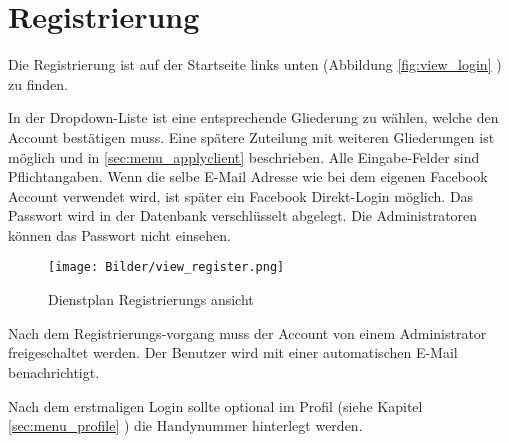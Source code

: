 \chapter{Registrierung}
\label{cha:register}

Die Registrierung ist auf der Startseite links unten (Abbildung  \ref{fig:view_login} \textit{}) zu finden.

\vspace*{5mm} \noindent In der Dropdown-Liste ist eine entsprechende Gliederung zu wählen, welche den Account bestätigen muss. Eine spätere Zuteilung mit weiteren Gliederungen ist möglich und in \ref{sec:menu_applyclient} \textit{} beschrieben. Alle Eingabe-Felder sind Pflichtangaben. Wenn die selbe E-Mail Adresse wie bei dem eigenen Facebook Account verwendet wird, ist später ein Facebook Direkt-Login möglich. Das Passwort wird in der Datenbank verschlüsselt abgelegt. Die Administratoren können das Passwort nicht einsehen.

\begin{figure}[h]
 \begin{addmargin}{-0.2\linewidth}
   \centering 
   \texttt{[image: Bilder/view\_register.png]}
 \end{addmargin} 
 \caption[Registrierungs ansicht]{Dienstplan Registrierungs ansicht}
 \label{fig:view_register}
\end{figure}

\vspace*{5mm} \noindent 
Nach dem Registrierungs-vorgang muss der Account von einem Administrator freigeschaltet werden. Der Benutzer wird mit einer automatischen E-Mail benachrichtigt.

\noindent Nach dem erstmaligen Login sollte optional im Profil (siehe Kapitel \ref{sec:menu_profile} \textit{}) die Handynummer hinterlegt werden.
